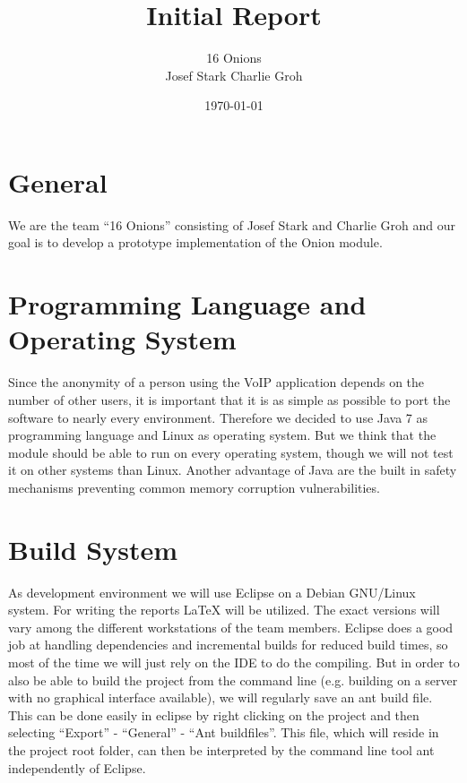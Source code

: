 \documentclass{article}
\begin{document}
\title{\Huge Initial Report \normalsize}
\date{\today}
\author{\LARGE 16 Onions \normalsize \\[5pt] Josef Stark \hspace{20pt} Charlie Groh}
\maketitle
\let\thefootnote\relax{}

\section{General}
We are the team ``16 Onions'' consisting of Josef Stark and Charlie Groh
and our goal is to develop a prototype implementation of the Onion module.

\section{Programming Language and Operating System}
Since the anonymity of a person using the VoIP application depends on the
number of other users, it is important that it is as simple as possible to port
the software to nearly every environment. Therefore we decided to use Java 7
as programming language and Linux as operating system. But we think that the
module should be able to run on every operating system, though we will not test
it on other systems than Linux. Another advantage of Java are the built in
safety mechanisms preventing common memory corruption vulnerabilities.

\section{Build System}
As development environment we will use Eclipse on a Debian GNU/Linux system. For
writing the reports LaTeX will be utilized. The exact versions will vary among the
different workstations of the team members.
Eclipse does a good job at handling dependencies and incremental builds for reduced build times, so most of the time we will just rely on the IDE to do the compiling. But in order to also be able to build the project from the command line (e.g. building on a server with no graphical interface available), we will regularly save an ant build file. This can be done easily in eclipse by right clicking on the project and then selecting ``Export'' - ``General'' - ``Ant buildfiles''. This file, which will reside in the project root folder, can then be interpreted by the command line tool ant independently of Eclipse.
\end{document}
